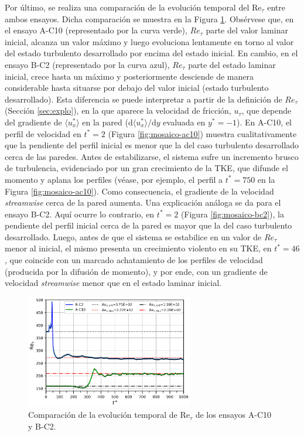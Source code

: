 Por último, se realiza una comparación de la evolución temporal del Re$_{\tau}$ entre ambos ensayos. Dicha comparación se muestra en la Figura \ref{fig:retau-comp}. Obsérvese que, en el ensayo \linebreak A-C10 (representado por la curva verde), $Re_{\tau}$ parte del valor laminar inicial, alcanza un \linebreak valor máximo y luego evoluciona lentamente en torno al valor del estado turbulento \linebreak desarrollado por encima del estado inicial. En cambio, en el ensayo B-C2 (representado por la curva azul), $Re_{\tau}$ parte del estado laminar inicial, crece hasta un máximo y \linebreak posteriormente   desciende  de manera considerable hasta situarse por debajo del valor inicial (estado turbulento desarrollado). Esta diferencia se puede interpretar a partir de la definición de $Re_{\tau}$ (Sección \ref{sec:explo}), en la que aparece la velocidad de fricción, $u_{\tau}$, que depende del gradiente de $\langle u^*_x  \rangle$ en la pared ($\mathrm{d}\langle u^*_x \rangle/\mathrm{d}y$ evaluada en $y^*=-1$). En A-C10, el perfil de velocidad en $t^*=2$ (Figura \ref{fig:mosaico-ac10}) muestra cualitativamente que la pendiente del perfil inicial es menor que la del caso turbulento desarrollado cerca de las paredes. Antes de estabilizarse, el sistema sufre un incremento brusco de turbulencia,  evidenciado por un gran crecimiento de la TKE, que difunde el momento y aplana los perfiles (véase, por ejemplo, el perfil a $t^*=750$ en la Figura \ref{fig:mosaico-ac10}). Como consecuencia, el gradiente de la velocidad \textit{streamwise} cerca de la pared aumenta. Una explicación análoga se da para el ensayo B-C2. Aquí ocurre lo contrario, en $t^*=2$ (Figura \ref{fig:mosaico-bc2}), la pendiente del perfil inicial cerca de la pared es mayor que la del caso turbulento desarrollado. Luego, antes de que el sistema se estabilice en un valor de $Re_{\tau}$ menor al inicial, el mismo presenta un crecimiento violento en su TKE, en $t^*=46$, que coincide con un marcado achatamiento de los perfiles de velocidad (producida por la difusión de momento), y por ende, con un gradiente de velocidad \textit{streamwise} menor que en el estado laminar inicial. 

\begin{figure}[H]
  \centering  
    \includegraphics[width=0.65\textwidth]{figures/cap6/comp_retau.png}
  \caption{Comparación de la evolución temporal de Re$_{\tau}$ de los ensayos A-C10 y B-C2.}
  \label{fig:retau-comp}
\end{figure}




